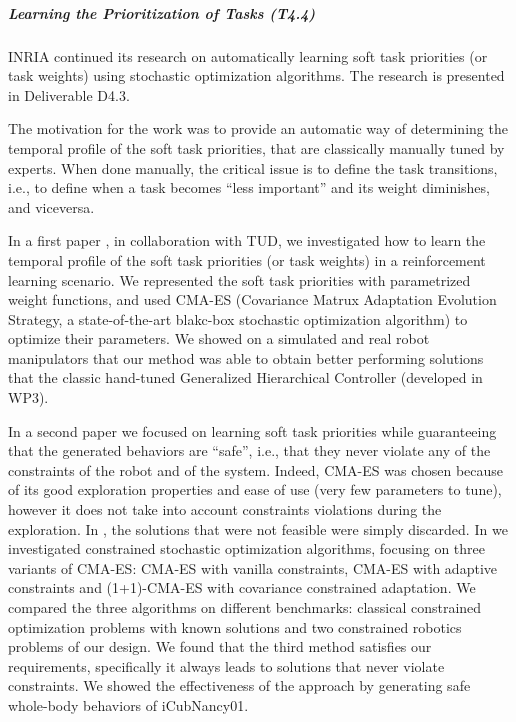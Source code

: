 \subparagraph{Learning the Prioritization of Tasks (T4.4)}

INRIA continued its research on automatically learning soft task priorities (or task weights) using stochastic optimization algorithms. The research is presented in Deliverable D4.3. 

The motivation for the work was to provide an automatic way of determining the temporal profile of the soft task priorities, that are classically manually tuned by experts. When done manually, the critical issue is to define the task transitions, i.e., to define when a task becomes ``less important'' and its weight diminishes, and viceversa.

In a first paper \cite{Modugno_PICRA_2016}, in collaboration with TUD, we investigated how to learn the temporal profile of the soft task priorities (or task weights) in a reinforcement learning scenario. We represented the soft task priorities with parametrized weight functions, and used CMA-ES (Covariance Matrux Adaptation Evolution Strategy, a state-of-the-art blakc-box stochastic optimization algorithm) to optimize their parameters. We showed on a simulated and real robot manipulators that our method was able to obtain better performing solutions that the classic hand-tuned Generalized Hierarchical Controller (developed in WP3).

In a second paper \cite{modugno2016learning} we focused on learning soft task priorities while guaranteeing that the generated behaviors are ``safe'', i.e., that they never violate any of the constraints of the robot and of the system. Indeed, CMA-ES was chosen because of its good exploration properties and ease of use (very few parameters to tune), however it does not take into account constraints violations during the exploration. In \cite{Modugno_PICRA_2016}, the solutions that were not feasible were simply discarded. In \cite{modugno2016learning} we investigated constrained stochastic optimization algorithms, focusing on three variants of CMA-ES: CMA-ES with vanilla constraints, CMA-ES with adaptive constraints and (1+1)-CMA-ES with covariance constrained adaptation. We compared the three algorithms on different benchmarks: classical constrained optimization problems with known solutions and two constrained robotics problems of our design. We found that the third method satisfies our requirements, specifically it always leads to solutions that never violate constraints. We showed the effectiveness of the approach by generating safe whole-body behaviors of iCubNancy01.

